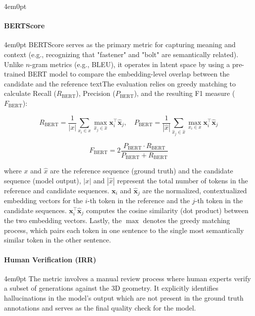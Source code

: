 \begin{indentedblock}{4em}{0pt}
				\paragraph{BERTScore \parencite{bertscore_zhang}}
					\begin{indentedblock}{4em}{0pt}
						BERTScore serves as the primary metric for capturing meaning and context (e.g., recognizing that "fastener" and "bolt" are semantically related). Unlike $n$-gram metrics (e.g., BLEU), it operates in latent space by using a pre-trained BERT model to compare the embedding-level overlap between the candidate and the reference textThe evaluation relies on greedy matching to calculate Recall ($R_{\text{BERT}}$), Precision ($P_{\text{BERT}}$), and the resulting F1 measure ($F_{\text{BERT}}$):
						
						\begin{equation}
							R_{\text{BERT}} = \frac{1}{|x|} \sum_{x_i \in x} \max_{\hat{x}_j \in \hat{x}} \mathbf{x}_i^\top \hat{\mathbf{x}}_j, \quad 
							P_{\text{BERT}} = \frac{1}{|\hat{x}|} \sum_{\hat{x}_j \in \hat{x}} \max_{x_i \in x} \mathbf{x}_i^\top \hat{\mathbf{x}}_j
						\end{equation}
						
						\begin{equation}
							F_{\text{BERT}} = 2 \frac{P_{\text{BERT}} \cdot R_{\text{BERT}}}{P_{\text{BERT}} + R_{\text{BERT}}}
						\end{equation}
						
						where $x$ and $\hat{x}$ are the reference sequence (ground truth) and the candidate sequence (model output), $|x|$ and $|\hat{x}|$ represent the total number of tokens in the reference and candidate sequences. $\mathbf{x}_i$ and $\hat{\mathbf{x}}_j$ are the normalized, contextualized embedding vectors for the $i$-th token in the reference and the $j$-th token in the candidate sequences. $\mathbf{x}_i^\top \hat{\mathbf{x}}_j$ computes the cosine similarity (dot product) between the two embedding vectors. Lastly, the $\max$ denotes the greedy matching process, which pairs each token in one sentence to the single most semantically similar token in the other sentence.
					\end{indentedblock}				
				\paragraph{Human Verification (IRR)}
					
					\begin{indentedblock}{4em}{0pt}
						\label{sec:irr}
						The metric involves a manual review process where human experts verify a subset of generations against the 3D geometry. It explicitly identifies hallucinations in the model's output which are not present in the ground truth annotations and serves as the final quality check for the model.
						

\end{indentedblock}
\end{indentedblock}
